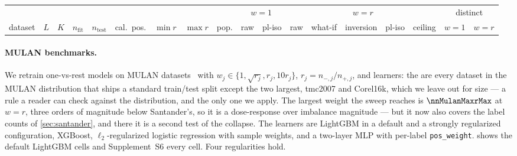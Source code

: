 \documentclass[sigconf,nonacm]{acmart}
\newcommand{\Supp}[1]{Supplement~#1}  %
\begin{document}
\begin{table}[t]
\label{tab:mulan}
\footnotesize
\setlength{\tabcolsep}{3pt}
\begin{tabular}{@{}lrrrrrrrr|cc|ccccc|cc@{}}
\toprule
 & & & & & & & & & \multicolumn{2}{c|}{$w{=}1$} & \multicolumn{5}{c|}{$w{=}r$} & \multicolumn{2}{c}{distinct} \\
dataset & $L$ & $K$ & $n_{\mathrm{fit}}$ & $n_{\mathrm{test}}$ & cal.\ pos. & $\min r$ & $\max r$ & pop. & raw & pl-iso & raw & what-if & inversion & pl-iso & ceiling & $w{=}1$ & $w{=}r$ \\
\midrule

\bottomrule
\end{tabular}
\end{table}

\paragraph{MULAN benchmarks.} We retrain one-vs-rest models on \nnMulan{} MULAN datasets~\cite{Tsoumakas2011MULAN} with $w_j\in\{1,\sqrt{r_j},r_j,10r_j\}$, $r_j=n_{-,j}/n_{+,j}$, and \nnLearners{} learners: the \nnMulan{} are every dataset in the MULAN distribution that ships a standard train/test split except the two largest, tmc2007 and Corel16k, which we leave out for size --- a rule a reader can check against the distribution, and the only one we apply. The largest weight the sweep reaches is $\nnMulanMaxrMax$ at $w{=}r$, three orders of magnitude below Santander's, so it is a dose-response over imbalance magnitude --- but it now also covers the label counts of \cref{sec:santander}, and there it is a second test of the collapse. The learners are LightGBM in a default and a strongly regularized configuration, XGBoost, $\ell_2$-regularized logistic regression with sample weights, and a two-layer MLP with per-label \texttt{pos\_weight}.  shows the default LightGBM cells and \Supp{S6} every cell. Four regularities hold.
\end{document}
